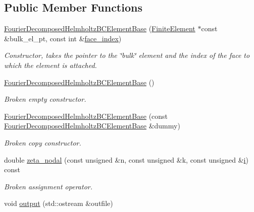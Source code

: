 \subsection*{Public Member Functions}
\begin{DoxyCompactItemize}
\item 
\hyperlink{classoomph_1_1FourierDecomposedHelmholtzBCElementBase_accbd3c1c2b10fa12e9932af07913487f}{Fourier\+Decomposed\+Helmholtz\+B\+C\+Element\+Base} (\hyperlink{classoomph_1_1FiniteElement}{Finite\+Element} $\ast$const \&bulk\+\_\+el\+\_\+pt, const int \&\hyperlink{classoomph_1_1FaceElement_a478d577ac6db67ecc80f1f02ae3ab170}{face\+\_\+index})
\begin{DoxyCompactList}\small\item\em Constructor, takes the pointer to the \char`\"{}bulk\char`\"{} element and the index of the face to which the element is attached. \end{DoxyCompactList}\item 
\hyperlink{classoomph_1_1FourierDecomposedHelmholtzBCElementBase_a0279036f276a91d48634674d4e371c0f}{Fourier\+Decomposed\+Helmholtz\+B\+C\+Element\+Base} ()
\begin{DoxyCompactList}\small\item\em Broken empty constructor. \end{DoxyCompactList}\item 
\hyperlink{classoomph_1_1FourierDecomposedHelmholtzBCElementBase_a76e278f8ff35a406344abfdb4a93c144}{Fourier\+Decomposed\+Helmholtz\+B\+C\+Element\+Base} (const \hyperlink{classoomph_1_1FourierDecomposedHelmholtzBCElementBase}{Fourier\+Decomposed\+Helmholtz\+B\+C\+Element\+Base} \&dummy)
\begin{DoxyCompactList}\small\item\em Broken copy constructor. \end{DoxyCompactList}\item 
double \hyperlink{classoomph_1_1FourierDecomposedHelmholtzBCElementBase_a6bbf014e96f180c90265e96fd00a0358}{zeta\+\_\+nodal} (const unsigned \&n, const unsigned \&k, const unsigned \&\hyperlink{cfortran_8h_adb50e893b86b3e55e751a42eab3cba82}{i}) const
\begin{DoxyCompactList}\small\item\em Broken assignment operator. \end{DoxyCompactList}\item 
void \hyperlink{classoomph_1_1FourierDecomposedHelmholtzBCElementBase_a17070cafb0b4d23fb736b022f7d9d36b}{output} (std\+::ostream \&outfile)

\end{DoxyCompactItemize}
